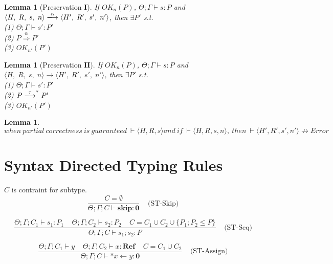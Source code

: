 \documentclass[english]{jssst_ppl} %
\newcommand\SKIP{\mathbf{skip}}
\newcommand\Rtab{\; \; \; \;}
\newcommand\coma{,\;}
\newtheorem{lemma}[theorem]{Lemma}
\begin{document}
\begin{lemma}[Preservation $\mathbf{I}$]%
If $OK_{n}(P)$, $\Theta; \Gamma \vdash s : P$ and $\langle H\coma R\coma s\coma n \rangle
\xlongrightarrow{\alpha}\langle H'\coma R'\coma s'\coma n'
\rangle$, then $\exists P'$ s.t. \\
(1) $ \Theta; \Gamma \vdash s' : P' $ \\
(2) $ P \overset{\text{$\alpha$}}{\Longrightarrow} P'$\\
(3) $ OK_{n'}(P') $
\end{lemma}
\begin{lemma}[Preservation $\mathbf{II}$]%
If $OK_{n}(P)$, $\Theta ; \Gamma \vdash s : P$ and $\langle H\coma R\coma s\coma n \rangle
\rightarrow \langle H'\coma R'\coma s'\coma n'
\rangle$, then $\exists P'$ s.t. \\
(1) $\Theta; \Gamma \vdash s' : P'$\\
(2) $ P \xlongrightarrow{\tau}^{*} P'  $\\
(3) $OK_{n'}(P')$
\end{lemma}

\begin{lemma}%
$when \  partial \  correctness \  is \  guaranteed \  \vdash \langle H,R,s \rangle and \  if \ \vdash \langle H,R,s,n \rangle, \  then \  \vdash \langle
H',R',s',n' \rangle \nrightarrow Error$
\end{lemma}

\section{Syntax Directed Typing Rules}

$C$ is contraint for subtype. \\

$$
     \frac{ C = \emptyset}
           {\Theta; \Gamma; C \vdash \SKIP : \mathbf{0}
             }
      \Rtab \mbox{(ST-Skip)}
$$

$$
      \frac{\Theta;\Gamma ; C_{1} \vdash s_{1} : P_{1} \Rtab \Theta; \Gamma ; C_{2} \vdash s_{2} : P_{2} \Rtab C = C_{1}\cup C_{2} \cup \{ P_{1};P_{2} \le P\}}
      {\Theta;\Gamma; C \vdash s_{1};s_{2} : P}
      \Rtab \mbox{(ST-Seq)}
$$

$$
      \frac{\Theta;\Gamma;C_{1} \vdash y \Rtab \Theta;\Gamma; C_{2} \vdash x : \mathbf{Ref} \Rtab C = C_{1}\cup C_{2}}
      {\Theta;\Gamma; C \vdash *x \leftarrow y : \mathbf{0}}
      \Rtab \mbox{(ST-Assign)}
$$
\end{document}
